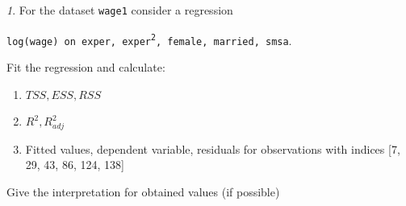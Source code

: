 \documentclass[12pt]{article}
\theoremstyle{remark}
\newtheorem{problem}{}[section]
\begin{document}
\begin{problem}
For the dataset \texttt{wage1} consider a regression
\begin{center}
\texttt{log(wage) on exper, exper\textsuperscript{2}, female, married, smsa}.
\end{center}
Fit the regression and calculate:
\begin{enumerate}
	\item \(TSS, ESS, RSS\)
	\item \(R^2, R^2_{adj}\)
	\item Fitted values, dependent variable, residuals 
	for observations with indices [7, 29, 43, 86, 124, 138]
\end{enumerate}
Give the interpretation for obtained values (if possible)
\end{problem}
\end{document}
